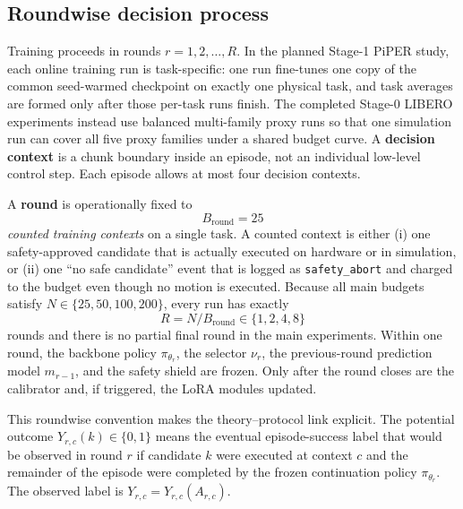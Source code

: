 \documentclass[10pt]{article}
\theoremstyle{plain}
\theoremstyle{definition}
\theoremstyle{remark}
\begin{document}
\subsection{Roundwise decision process}
Training proceeds in rounds $r=1,2,\dots,R$. In the planned Stage-1 PiPER study, each online training run is task-specific: one run fine-tunes one copy of the common seed-warmed checkpoint on exactly one physical task, and task averages are formed only after those per-task runs finish. The completed Stage-0 LIBERO experiments instead use balanced multi-family proxy runs so that one simulation run can cover all five proxy families under a shared budget curve. A \textbf{decision context} is a chunk boundary inside an episode, not an individual low-level control step. Each episode allows at most four decision contexts.

A \textbf{round} is operationally fixed to
\[
B_{\mathrm{round}}=25
\]
\emph{counted training contexts} on a single task. A counted context is either (i) one safety-approved candidate that is actually executed on hardware or in simulation, or (ii) one ``no safe candidate'' event that is logged as \texttt{safety\_abort} and charged to the budget even though no motion is executed. Because all main budgets satisfy $N\in\{25,50,100,200\}$, every run has exactly
\[
R=N/B_{\mathrm{round}}\in\{1,2,4,8\}
\]
rounds and there is no partial final round in the main experiments. Within one round, the backbone policy $\pi_{\theta_r}$, the selector $\nu_r$, the previous-round prediction model $m_{r-1}$, and the safety shield are frozen. Only after the round closes are the calibrator and, if triggered, the LoRA modules updated.

This roundwise convention makes the theory--protocol link explicit. The potential outcome $Y_{r,c}(k)\in\{0,1\}$ means the eventual episode-success label that would be observed in round $r$ if candidate $k$ were executed at context $c$ and the remainder of the episode were completed by the frozen continuation policy $\pi_{\theta_r}$. The observed label is $Y_{r,c}=Y_{r,c}(A_{r,c})$.
\end{document}
